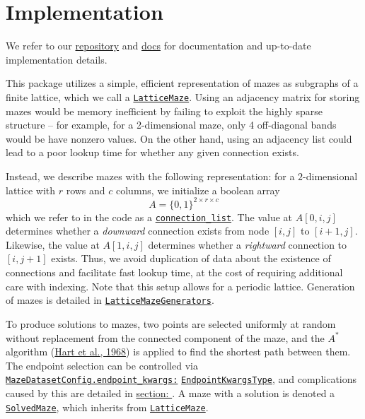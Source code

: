 \documentclass[10pt,a4paper,onecolumn]{article}
\begin{document}
\hypertarget{sec:implementation}{%
\section{Implementation}\label{sec:implementation}}

We refer to our
\href{https://github.com/understanding-search/maze-dataset}{repository}
and
\href{https://understanding-search.github.io/maze-dataset/maze_dataset.html}{docs}
for documentation and up-to-date implementation details.

This package utilizes a simple, efficient representation of mazes as
subgraphs of a finite lattice, which we call a
\href{https://understanding-search.github.io/maze-dataset/maze_dataset.html\#LatticeMaze}{\texttt{LatticeMaze}}.
Using an adjacency matrix for storing mazes would be memory inefficient
by failing to exploit the highly sparse structure -- for example, for a
2-dimensional maze, only 4 off-diagonal bands would be have nonzero
values. On the other hand, using an adjacency list could lead to a poor
lookup time for whether any given connection exists.

Instead, we describe mazes with the following representation: for a
\(2\)-dimensional lattice with \(r\) rows and \(c\) columns, we
initialize a boolean array \[
  A = \{0, 1\}^{2 \times r \times c}
\] which we refer to in the code as a
\href{https://understanding-search.github.io/maze-dataset/maze_dataset.html\#LatticeMaze.connection_list}{\texttt{connection\_list}}.
The value at \(A[0,i,j]\) determines whether a \emph{downward}
connection exists from node \([i,j]\) to \([i+1, j]\). Likewise, the
value at \(A[1,i,j]\) determines whether a \emph{rightward} connection
to \([i, j+1]\) exists. Thus, we avoid duplication of data about the
existence of connections and facilitate fast lookup time, at the cost of
requiring additional care with indexing. Note that this setup allows for
a periodic lattice. Generation of mazes is detailed in
\href{https://understanding-search.github.io/maze-dataset/maze_dataset.html\#LatticeMazeGenerators}{\texttt{LatticeMazeGenerators}}.

To produce solutions to mazes, two points are selected uniformly at
random without replacement from the connected component of the maze, and
the \(A^*\) algorithm (\protect\hyperlink{ref-A_star}{Hart et al.,
1968}) is applied to find the shortest path between them. The endpoint
selection can be controlled via
\href{https://understanding-search.github.io/maze-dataset/maze_dataset/dataset/maze_dataset_config.html\#MazeDatasetConfig.endpoint_kwargs}{\texttt{MazeDatasetConfig.endpoint\_kwargs:}}
\href{https://understanding-search.github.io/maze-dataset/maze_dataset/dataset/maze_dataset_config.html\#EndpointKwargsType}{\texttt{EndpointKwargsType}},
and complications caused by this are detailed in
\hyperref[sec:success-rate-estimation]{section: \textit{}}.
A maze with a solution is denoted a
\href{https://understanding-search.github.io/maze-dataset/maze_dataset.html\#SolvedMaze}{\texttt{SolvedMaze}},
which inherits from
\href{https://understanding-search.github.io/maze-dataset/maze_dataset.html\#LatticeMaze}{\texttt{LatticeMaze}}.
\end{document}
